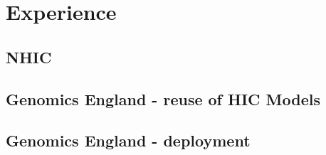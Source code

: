 \section{Experience}
\subsection{NHIC}
\subsection{Genomics England - reuse of HIC Models}
\subsection{Genomics England -  deployment}
